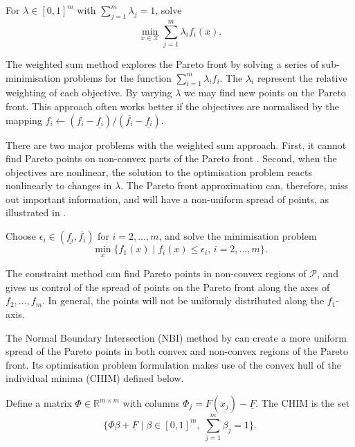 \documentclass[main.tex]{subfiles}
\begin{document}
\begin{mydef}
  For $\lambda \in {[0,1]}^m$ with $\sum_{j=1}^m\lambda_j = 1$, solve
  \begin{equation}
    \min_{x\in\mathcal{X}} \sum_{j=1}^m \lambda_i f_i(x).
  \end{equation}
\end{mydef}
The weighted sum method explores the Pareto front by solving a series
of sub-minimisation problems for the function $\sum_{i=1}^m\lambda_i f_i$.
The $\lambda_i$ represent the relative weighting of each
objective. By varying $\lambda$  we may find new points on the Pareto front.
This approach often works better if the objectives are normalised by the
mapping $f_i\leftarrow (f_i-\underline
{f_i})/(\overline{f_i}-\underline{f_i})$.

There are two major problems with the weighted sum approach. First,
it cannot find Pareto points on non-convex parts of the Pareto
front \citep{messac2000aggregate}.
Second, when the objectives are nonlinear, the solution to the
optimisation problem reacts nonlinearly to changes in $\lambda$.
The Pareto front approximation can, therefore, miss out important
information, and will
have a non-uniform spread of points, as illustrated in
.

\begin{mydef}
  Choose
  $\epsilon_i\in(\underline{f_i},\overline{f_i})$ for $i=2,\dots,m$, and
  solve the minimisation problem
  \begin{equation}\label{eq:pareto_constraint_method}
    \min_x\{f_1(x)\mid f_i(x)\leq \epsilon_i,\, i=2,\dots,m\}.
  \end{equation}
\end{mydef}
The constraint method can find Pareto points in non-convex regions of
$\mathcal{P}$, and gives us control of the spread of points on the Pareto front
along the axes of $f_2,\dots,f_m$. In general, the points will not be
uniformly distributed along the $f_1$-axis.

The Normal Boundary Intersection (NBI) method by \citet{das1998normal} can
create a more uniform spread of the Pareto points in both convex and
non-convex regions of the Pareto front. Its optimisation problem
formulation makes use of the convex hull of the individual minima
(CHIM) defined below.
\begin{mydef}
  Define a matrix $\Phi\in\mathbb{R}^{m\times m}$ with columns
  $\Phi_j = F(\underline{x_j})-\underline{F}$.
  The CHIM is the set
  \begin{equation}\textstyle
    \{\Phi\beta + \underline{F} \mid \beta\in{[0,1]}^m,\;\sum_{j=1}^m\beta_j = 1\}.
  \end{equation}
\end{mydef}
\end{document}

